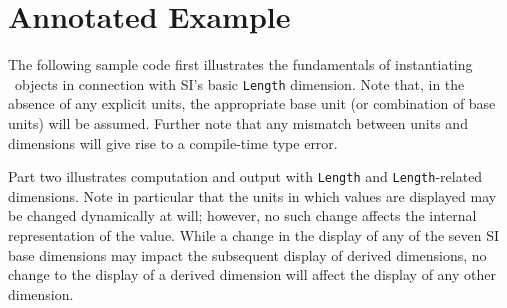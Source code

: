 

\section{ Annotated Example }

The following sample code first illustrates
the fundamentals of instantiating \SIlib\ objects
in connection with SI's basic {\tt Length} dimension.
Note that, in the absence of any explicit units,
the appropriate base unit (or combination of base units)
will be assumed.
Further note that any mismatch between units and
dimensions will give rise to a compile-time type error.

Part two illustrates computation and output
with {\tt Length} and {\tt Length}-related dimensions.
Note in particular that the units in which values
are displayed may be changed dynamically at will;
however, no such change affects the internal representation of the value.
While a change in the display of any of the seven SI base dimensions
may impact the subsequent display of derived dimensions,
no change to the display of a derived dimension
will affect the display of any other dimension.

